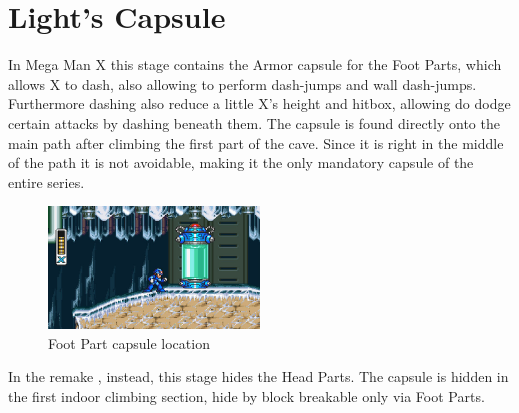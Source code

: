 \section{Light's Capsule}\label{X:Foot_Parts}
In Mega Man X this stage contains the Armor capsule for the Foot Parts, which allows X to dash, also allowing to perform dash-jumps and wall dash-jumps. Furthermore dashing also reduce a little X's height and hitbox, allowing do dodge certain attacks by dashing beneath them. The capsule is found directly onto the main path after climbing the first part of the cave. Since it is right in the middle of the path it is not avoidable, making it the only mandatory capsule of the entire series.
\begin{figure}[htp]
	\centering
	\includegraphics[width=0.5\textwidth]{figures/X1/Chill_penguin/Armor_foot.jpg}
	\caption{Foot Part capsule location}
\end{figure}

In the remake \mhx, instead, this stage hides the Head Parts. The capsule is hidden in the first indoor climbing section, hide by block breakable only via Foot Parts.
